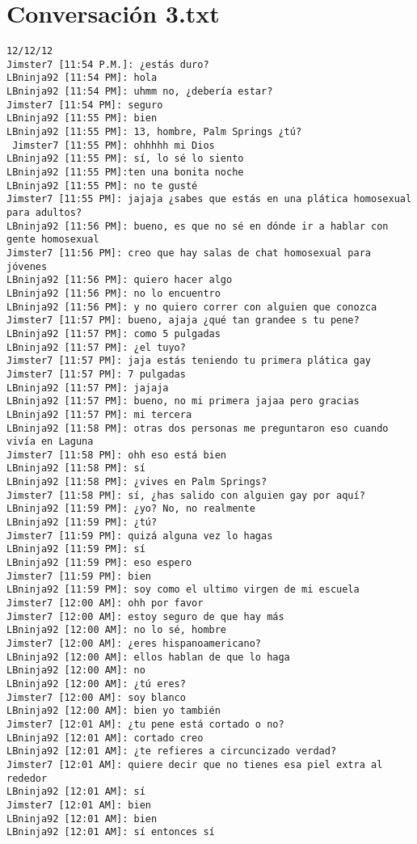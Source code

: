 \section{Conversaci\'on 3.txt}

\begin{verbatim}
12/12/12
Jimster7 [11:54 P.M.]: ¿estás duro?
LBninja92 [11:54 PM]: hola
LBninja92 [11:54 PM]: uhmm no, ¿debería estar?
Jimster7 [11:54 PM]: seguro
LBninja92 [11:55 PM]: bien
LBninja92 [11:55 PM]: 13, hombre, Palm Springs ¿tú?
 Jimster7 [11:55 PM]: ohhhhh mi Dios
LBninja92 [11:55 PM]: sí, lo sé lo siento
LBninja92 [11:55 PM]:ten una bonita noche
LBninja92 [11:55 PM]: no te gusté
Jimster7 [11:55 PM]: jajaja ¿sabes que estás en una plática homosexual para adultos?
LBninja92 [11:56 PM]: bueno, es que no sé en dónde ir a hablar con gente homosexual
Jimster7 [11:56 PM]: creo que hay salas de chat homosexual para jóvenes
LBninja92 [11:56 PM]: quiero hacer algo
LBninja92 [11:56 PM]: no lo encuentro
LBninja92 [11:56 PM]: y no quiero correr con alguien que conozca
Jimster7 [11:57 PM]: bueno, ajaja ¿qué tan grandee s tu pene?
LBninja92 [11:57 PM]: como 5 pulgadas
LBninja92 [11:57 PM]: ¿el tuyo?
Jimster7 [11:57 PM]: jaja estás teniendo tu primera plática gay
Jimster7 [11:57 PM]: 7 pulgadas
LBninja92 [11:57 PM]: jajaja
LBninja92 [11:57 PM]: bueno, no mi primera jajaa pero gracias
LBninja92 [11:57 PM]: mi tercera
LBninja92 [11:58 PM]: otras dos personas me preguntaron eso cuando vivía en Laguna
Jimster7 [11:58 PM]: ohh eso está bien
LBninja92 [11:58 PM]: sí
LBninja92 [11:58 PM]: ¿vives en Palm Springs?
Jimster7 [11:58 PM]: sí, ¿has salido con alguien gay por aquí?
LBninja92 [11:59 PM]: ¿yo? No, no realmente
LBninja92 [11:59 PM]: ¿tú?
Jimster7 [11:59 PM]: quizá alguna vez lo hagas
LBninja92 [11:59 PM]: sí
LBninja92 [11:59 PM]: eso espero
Jimster7 [11:59 PM]: bien
LBninja92 [11:59 PM]: soy como el ultimo virgen de mi escuela
Jimster7 [12:00 AM]: ohh por favor
Jimster7 [12:00 AM]: estoy seguro de que hay más
LBninja92 [12:00 AM]: no lo sé, hombre
Jimster7 [12:00 AM]: ¿eres hispanoamericano?
LBninja92 [12:00 AM]: ellos hablan de que lo haga
LBninja92 [12:00 AM]: no
LBninja92 [12:00 AM]: ¿tú eres?
Jimster7 [12:00 AM]: soy blanco
LBninja92 [12:00 AM]: bien yo también
Jimster7 [12:01 AM]: ¿tu pene está cortado o no?
LBninja92 [12:01 AM]: cortado creo
LBninja92 [12:01 AM]: ¿te refieres a circuncizado verdad?
Jimster7 [12:01 AM]: quiere decir que no tienes esa piel extra al rededor
LBninja92 [12:01 AM]: sí
Jimster7 [12:01 AM]: bien
LBninja92 [12:01 AM]: bien
LBninja92 [12:01 AM]: sí entonces sí

\end{verbatim}
